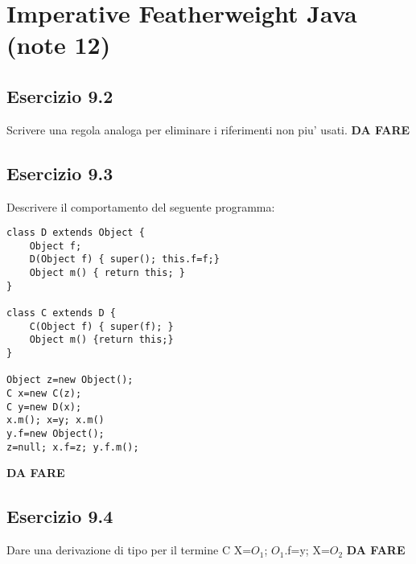 \section{Imperative Featherweight Java (note 12)}  
\subsection*{Esercizio 9.2} 
Scrivere una regola analoga per eliminare i riferimenti non piu' usati.
\textbf{{\color{red} DA FARE}}

\subsection*{Esercizio 9.3}  
Descrivere il comportamento del seguente programma:
\begin{lstlisting}
class D extends Object {
	Object f;
	D(Object f) { super(); this.f=f;}
	Object m() { return this; }
}
 
class C extends D {
	C(Object f) { super(f); }
	Object m() {return this;}
}

Object z=new Object();
C x=new C(z);
C y=new D(x);
x.m(); x=y; x.m()
y.f=new Object();
z=null; x.f=z; y.f.m();
\end{lstlisting}

\textbf{{\color{red} DA FARE}}

\subsection*{Esercizio 9.4} 
Dare una derivazione di tipo per il termine C X=$O_1$; $O_1$.f=y; X=$O_2$
\textbf{{\color{red} DA FARE}} 